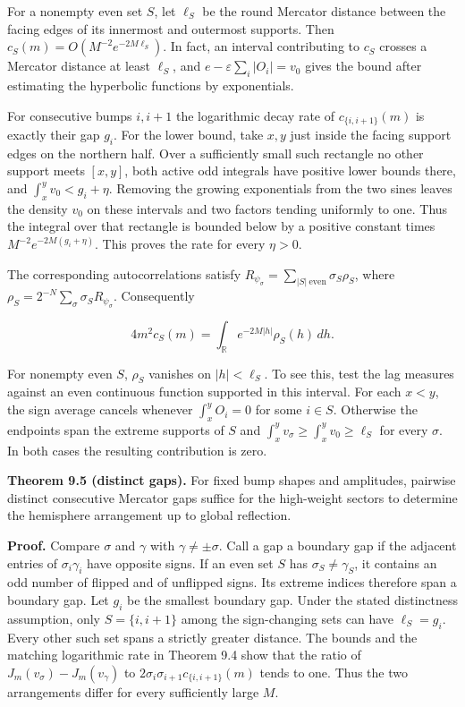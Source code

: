 \documentclass[11pt,letterpaper]{article}
\begin{document}
For a nonempty even set \(S\), let \(\ell_S\) be the round Mercator distance between the
facing edges of its innermost and outermost supports. Then
\(c_S(m)=O(M^{-2}e^{-2M\ell_S})\). In fact, an interval contributing to \(c_S\) crosses a
Mercator distance at least \(\ell_S\), and \(e-\varepsilon\sum_i|O_i|=v_0\) gives the bound
after estimating the hyperbolic functions by exponentials.

For consecutive bumps \(i,i+1\) the logarithmic decay rate of \(c_{\{i,i+1\}}(m)\) is
exactly their gap \(g_i\). For the lower bound, take \(x,y\) just inside the facing support
edges on the northern half. Over a sufficiently small such rectangle no other support meets
\([x,y]\), both active odd integrals have positive lower bounds there, and
\(\int_x^y v_0<g_i+\eta\). Removing the growing exponentials from the two sines leaves the
density \(v_0\) on these intervals and two factors tending uniformly to one. Thus the
integral over that rectangle is bounded below by a positive constant times
\(M^{-2}e^{-2M(g_i+\eta)}\). This proves the rate for every \(\eta>0\).

The corresponding autocorrelations satisfy
\(R_{\psi_\sigma}=\sum_{|S|\ {\mathrm{even}}}\sigma_S\rho_S\), where
\(\rho_S=2^{-N}\sum_\sigma\sigma_S R_{\psi_\sigma}\). Consequently

\[4m^2c_S(m)=\int_{\mathbb R}e^{-2M|h|}\rho_S(h)\,dh.\]

For nonempty even \(S\), \(\rho_S\) vanishes on \(|h|<\ell_S\). To see this, test the lag
measures against an even continuous function supported in this interval. For each \(x<y\),
the sign average cancels whenever \(\int_x^y O_i=0\) for some \(i\in S\). Otherwise the
endpoints span the extreme supports of \(S\) and
\(\int_x^y v_\sigma\ge\int_x^y v_0\ge\ell_S\) for every \(\sigma\). In both cases the
resulting contribution is zero.

\textbf{Theorem 9.5 (distinct gaps).} For fixed bump shapes and amplitudes, pairwise
distinct consecutive Mercator gaps suffice for the high-weight sectors to determine the
hemisphere arrangement up to global reflection.

\textbf{Proof.} Compare \(\sigma\) and \(\gamma\) with \(\gamma\ne\pm\sigma\). Call a gap a
boundary gap if the adjacent entries of \(\sigma_i\gamma_i\) have opposite signs. If an even
set \(S\) has \(\sigma_S\ne\gamma_S\), it contains an odd number of flipped and of unflipped
signs. Its extreme indices therefore span a boundary gap. Let \(g_i\) be the smallest
boundary gap. Under the stated distinctness assumption, only \(S=\{i,i+1\}\) among the
sign-changing sets can have \(\ell_S=g_i\). Every other such set spans a strictly greater
distance. The bounds and the matching logarithmic rate in Theorem 9.4 show that the ratio of
\(J_m(v_\sigma)-J_m(v_\gamma)\) to \(2\sigma_i\sigma_{i+1}c_{\{i,i+1\}}(m)\) tends to one.
Thus the two arrangements differ for every sufficiently large \(M\).
\end{document}
